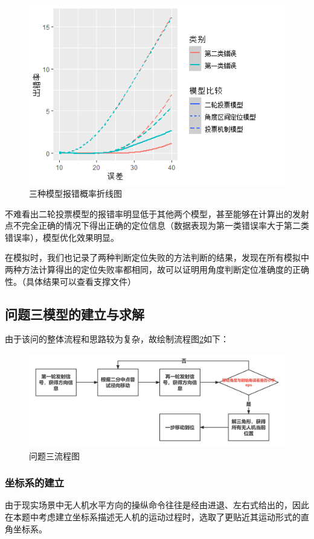\documentclass{ctexart}
\begin{document}
\begin{figure}[htbp]
    \centering
    \includegraphics[width=0.60\linewidth]{pic/三类比较.png}
    \caption{三种模型报错概率折线图}
    \label{三种模型报错概率折线图}
\end{figure}

不难看出二轮投票模型的报错率明显低于其他两个模型，甚至能够在计算出的发射点不完全正确的情况下得出正确的定位信息（数据表现为第一类错误率大于第二类错误率），模型优化效果明显。

在模拟时，我们也记录了两种判断定位失败的方法判断的结果，发现在所有模拟中两种方法计算得出的定位失败率都相同，故可以证明用角度判断定位准确度的正确性。（具体结果可以查看支撑文件）



\subsection{问题三模型的建立与求解}
由于该问的整体流程和思路较为复杂，故绘制流程图\ref{问题三流程图}如下：

\begin{figure}[H]
  \centering
  \includegraphics[width=0.85\linewidth]{pic/流程图（1）.jpg}
  \caption{问题三流程图}
  \label{问题三流程图}
  \end{figure}
  \subsubsection{坐标系的建立}

由于现实场景中无人机水平方向的操纵命令往往是经由进退、左右式给出的，因此在本题中考虑建立坐标系描述无人机的运动过程时，选取了更贴近其运动形式的直角坐标系。
\end{document}
